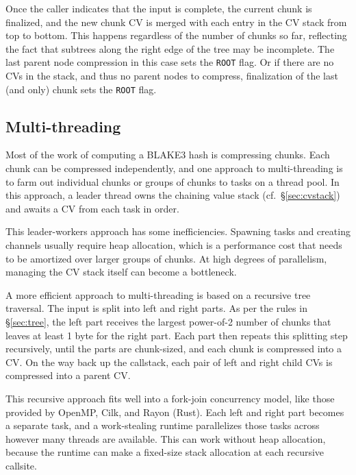 \documentclass[12pt,notitlepage,a4paper]{article}
\begin{document}
Once the caller indicates that the input is complete, the current chunk is
finalized, and the new chunk CV is merged with each entry in the CV stack from
top to bottom. This happens regardless of the number of chunks so far,
reflecting the fact that subtrees along the right edge of the tree may be
incomplete. The last parent node compression in this case sets the
\texttt{ROOT} flag. Or if there are no CVs in the stack, and thus no parent
nodes to compress, finalization of the last (and only) chunk sets the
\texttt{ROOT} flag.

\subsection{Multi-threading}\label{sec:multithreading}

Most of the work of computing a BLAKE3 hash is compressing chunks. Each chunk
can be compressed independently, and one approach to multi-threading is to farm
out individual chunks or groups of chunks to tasks on a thread pool. In this
approach, a leader thread owns the chaining value stack
(cf.~\S\ref{sec:cvstack}) and awaits a CV from each task in order.

This leader-workers approach has some inefficiencies. Spawning tasks and
creating channels usually require heap allocation, which is a performance cost
that needs to be amortized over larger groups of chunks. At high degrees of
parallelism, managing the CV stack itself can become a bottleneck.

A more efficient approach to multi-threading is based on a recursive tree
traversal. The input is split into left and right parts. As per the rules in
\S\ref{sec:tree}, the left part receives the largest power-of-2 number of
chunks that leaves at least 1 byte for the right part. Each part then repeats
this splitting step recursively, until the parts are chunk-sized, and each
chunk is compressed into a CV. On the way back up the callstack, each pair of
left and right child CVs is compressed into a parent CV.

This recursive approach fits well into a fork-join concurrency model, like
those provided by OpenMP, Cilk, and Rayon (Rust). Each left and right part
becomes a separate task, and a work-stealing runtime parallelizes those tasks
across however many threads are available. This can work without heap
allocation, because the runtime can make a fixed-size stack allocation at each
recursive callsite.
\end{document}
